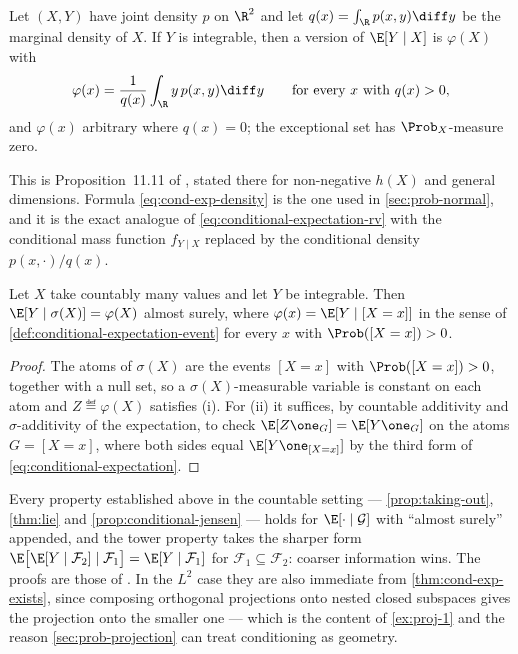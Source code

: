 \begin{proposition}\label{prop:cond-exp-density}
	Let $(X,Y)$ have joint density $p$ on $\R^2$ and let $q(x)=\int_\R p(x,y)\diff y$
	be the marginal density of $X$. If $Y$ is integrable, then a version of
	$\E[Y\mid X]$ is $\varphi(X)$ with
	\begin{equation}\label{eq:cond-exp-density}
		\varphi(x)=\frac{1}{q(x)}\int_{\R}y\,p(x,y)\diff y
		\qquad\text{for every }x\text{ with }q(x)>0,
	\end{equation}
	and $\varphi(x)$ arbitrary where $q(x)=0$; the exceptional set has
	$\Prob_X$-measure zero.
\end{proposition}

This is Proposition~11.11 of \textcite[p.~244]{legall2022measure}, stated there
for non-negative $h(X)$ and general dimensions. Formula
\eqref{eq:cond-exp-density} is the one used in \autoref{sec:prob-normal}, and it
is the exact analogue of \eqref{eq:conditional-expectation-rv} with the
conditional mass function $f_{Y\mid X}$ replaced by the conditional density
$p(x,\cdot)/q(x)$.

\begin{proposition}\label{prop:cond-exp-discrete}
	Let $X$ take countably many values and let $Y$ be integrable. Then
	$\E[Y\mid\sigma(X)]=\varphi(X)$ almost surely, where
	$\varphi(x)=\E[Y\mid[X=x]]$ in the sense of
	\autoref{def:conditional-expectation-event} for every $x$ with $\Prob([X=x])>0$.
\end{proposition}

\begin{proof}
	The atoms of $\sigma(X)$ are the events $[X=x]$ with $\Prob([X=x])>0$, together
	with a null set, so a $\sigma(X)$-measurable variable is constant on each atom
	and $Z\eqdef\varphi(X)$ satisfies (i). For (ii) it suffices, by countable
	additivity and $\sigma$-additivity of the expectation, to check
	$\E[Z\one_G]=\E[Y\one_G]$ on the atoms $G=[X=x]$, where both sides equal
	$\E[Y\one_{[X=x]}]$ by the third form of \eqref{eq:conditional-expectation}.
\end{proof}

Every property established above in the countable setting ---
\autoref{prop:taking-out}, \autoref{thm:lie} and
\autoref{prop:conditional-jensen} --- holds for $\E[\cdot\mid\mathcal{G}]$ with ``almost
surely'' appended, and the tower property takes the sharper form
$\E\bigl[\E[Y\mid\mathcal{F}_2]\mid\mathcal{F}_1\bigr]=\E[Y\mid\mathcal{F}_1]$ for
$\mathcal{F}_1\subseteq\mathcal{F}_2$: coarser information wins. The proofs are those of
\textcite[pp.~234--235, 238--241]{legall2022measure}. In the $L^{2}$ case they are
also immediate from \autoref{thm:cond-exp-exists}, since composing orthogonal
projections onto nested closed subspaces gives the projection onto the smaller
one --- which is the content of \autoref{ex:proj-1} and the reason
\autoref{sec:prob-projection} can treat conditioning as geometry.

